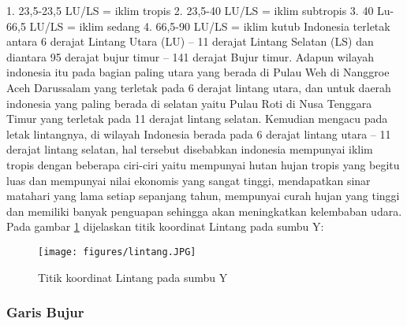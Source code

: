 1. 23,5-23,5 LU/LS = iklim tropis
2. 23,5-40 LU/LS = iklim subtropis
3. 40 Lu-66,5 LU/LS = iklim sedang
4. 66,5-90 LU/LS = iklim kutub
Indonesia terletak antara 6 derajat Lintang Utara (LU) – 11 derajat Lintang Selatan (LS) dan diantara 95 derajat bujur timur – 141 derajat Bujur timur.
Adapun wilayah indonesia itu pada bagian paling utara yang berada di Pulau Weh di Nanggroe Aceh Darussalam yang terletak pada 6 derajat lintang utara, dan untuk daerah indonesia yang paling berada di selatan yaitu Pulau Roti di Nusa Tenggara Timur yang terletak pada 11 derajat lintang selatan. Kemudian mengacu pada letak lintangnya, di wilayah Indonesia berada pada 6 derajat lintang utara – 11 derajat lintang selatan, hal tersebut disebabkan indonesia mempunyai iklim tropis dengan beberapa ciri-ciri yaitu mempunyai hutan hujan tropis yang begitu luas dan mempunyai nilai ekonomis yang sangat tinggi, mendapatkan sinar matahari yang lama setiap sepanjang tahun, mempunyai curah hujan yang tinggi dan memiliki banyak penguapan sehingga akan meningkatkan kelembaban udara.
Pada gambar \ref{lintang} dijelaskan titik koordinat Lintang pada sumbu Y:
\begin{figure}[ht]

	\centerline{\texttt{[image: figures/lintang.JPG]}}
	\caption{Titik koordinat Lintang pada sumbu Y}

	\label{lintang}
	\end{figure}

\subsubsection{Garis Bujur}

